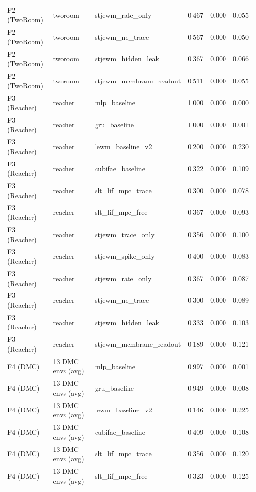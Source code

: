 \documentclass{article}
\begin{document}
\begin{table}[ht]
\begin{tabular}{lllrrr}
F2 (TwoRoom) & tworoom & stjewm\_rate\_only         & 0.467 & 0.000 & 0.055 \\
F2 (TwoRoom) & tworoom & stjewm\_no\_trace          & 0.567 & 0.000 & 0.050 \\
F2 (TwoRoom) & tworoom & stjewm\_hidden\_leak       & 0.367 & 0.000 & 0.066 \\
F2 (TwoRoom) & tworoom & stjewm\_membrane\_readout  & 0.511 & 0.000 & 0.055 \\
\midrule
F3 (Reacher) & reacher & mlp\_baseline              & 1.000 & 0.000 & 0.000 \\
F3 (Reacher) & reacher & gru\_baseline              & 1.000 & 0.000 & 0.001 \\
F3 (Reacher) & reacher & lewm\_baseline\_v2         & 0.200 & 0.000 & 0.230 \\
F3 (Reacher) & reacher & cubifae\_baseline          & 0.322 & 0.000 & 0.109 \\
F3 (Reacher) & reacher & slt\_lif\_mpc\_trace       & 0.300 & 0.000 & 0.078 \\
F3 (Reacher) & reacher & slt\_lif\_mpc\_free        & 0.367 & 0.000 & 0.093 \\
F3 (Reacher) & reacher & stjewm\_trace\_only        & 0.356 & 0.000 & 0.100 \\
F3 (Reacher) & reacher & stjewm\_spike\_only        & 0.400 & 0.000 & 0.083 \\
F3 (Reacher) & reacher & stjewm\_rate\_only         & 0.367 & 0.000 & 0.087 \\
F3 (Reacher) & reacher & stjewm\_no\_trace          & 0.300 & 0.000 & 0.089 \\
F3 (Reacher) & reacher & stjewm\_hidden\_leak       & 0.333 & 0.000 & 0.103 \\
F3 (Reacher) & reacher & stjewm\_membrane\_readout  & 0.189 & 0.000 & 0.121 \\
\midrule
F4 (DMC) & 13 DMC envs (avg) & mlp\_baseline              & 0.997 & 0.000 & 0.001 \\
F4 (DMC) & 13 DMC envs (avg) & gru\_baseline              & 0.949 & 0.000 & 0.008 \\
F4 (DMC) & 13 DMC envs (avg) & lewm\_baseline\_v2         & 0.146 & 0.000 & 0.225 \\
F4 (DMC) & 13 DMC envs (avg) & cubifae\_baseline          & 0.409 & 0.000 & 0.108 \\
F4 (DMC) & 13 DMC envs (avg) & slt\_lif\_mpc\_trace       & 0.356 & 0.000 & 0.120 \\
F4 (DMC) & 13 DMC envs (avg) & slt\_lif\_mpc\_free        & 0.323 & 0.000 & 0.125 \\

\end{tabular}
\end{table}
\end{document}

